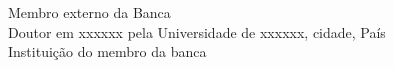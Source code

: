 \begin{folhadeaprovacao}
   \hfill 
   
    \begin{flushleft}
    Membro externo da Banca \hrulefill \\
    Doutor em xxxxxx pela Universidade de xxxxxx, cidade, País \\
    Instituição do membro da banca
   \end{flushleft}
   
   \begin{center}
    \vspace*{0.5cm}
    {\large\imprimirlocal}
    \par
    {\large\imprimirdata}
    \vspace*{1cm}
  \end{center}
  
\end{folhadeaprovacao}
